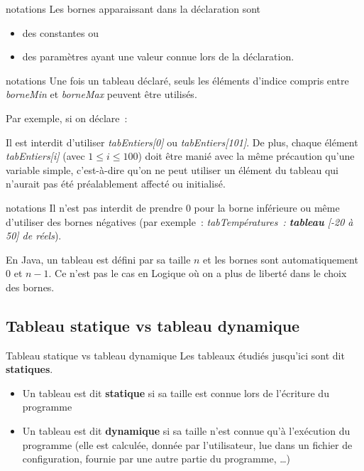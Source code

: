 \begin{frame}{notations}
	Les bornes apparaissant dans la déclaration sont 
	\begin{itemize}
	\item
	des constantes ou 
	\item
	des paramètres ayant une valeur connue lors de la déclaration. 
	\end{itemize}
\end{frame}

\begin{frame}{notations}
	Une fois un
	tableau déclaré, seuls les éléments d’indice compris entre
	\textit{borneMin} et \textit{borneMax} peuvent
	être utilisés. 
	
	\bigskip
	
	Par exemple, si on déclare~:

	
	\bigskip
	
	Il est interdit d’utiliser \textit{tabEntiers[0]} ou
	\textit{tabEntiers[101]}. De plus, chaque élément
	\textit{tabEntiers[i]} (avec $1 \leq i \leq 100$) doit
	être manié avec la même précaution qu’une variable simple, c’est-à-dire
	qu’on ne peut utiliser un élément du tableau qui n’aurait pas été
	préalablement affecté ou initialisé.
\end{frame}

\begin{frame}{notations}
	Il n'est pas interdit de prendre 0 pour la borne
	inférieure ou même d'utiliser des bornes négatives
	(par exemple~: \textit{tabTempératures~: 
	\textbf{tableau} [-20 à 50] de réels}).

	\bigskip
	
	En Java, un tableau est défini par sa taille $n$ et les bornes sont
	automatiquement $0$ et $n-1$. Ce n'est pas le cas en
	Logique où on a plus de liberté dans le choix des bornes.
\end{frame}

\subsection{Tableau statique vs tableau dynamique}

\begin{frame}{Tableau statique vs tableau dynamique}
	Les tableaux étudiés jusqu'ici sont dit \textbf{statiques}.
	
	\begin{itemize}
	\item
	Un tableau est dit \textbf{statique} si sa taille 
	est connue lors de l’écriture du programme
	\item
	Un tableau est dit \textbf{dynamique}
	si sa taille n’est connue qu’à l’exécution du programme (elle est
	calculée, donnée par l’utilisateur, lue dans un fichier de
	configuration, fournie par une autre partie du programme, \dots)
	\end{itemize}
\end{frame}

